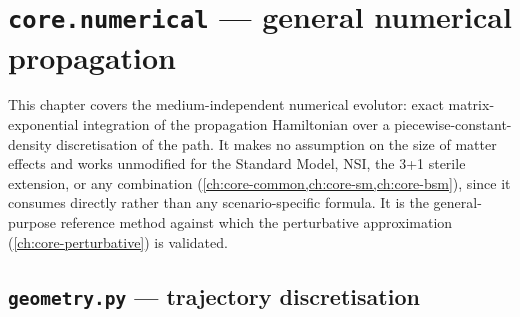 \chapter{\texttt{core.numerical} --- general numerical propagation}
\label{ch:core-numerical}

This chapter covers the medium-independent numerical evolutor: exact
matrix-exponential integration of the propagation Hamiltonian over a
piecewise-constant-density discretisation of the path. It makes no
assumption on the size of matter effects and works unmodified for the
Standard Model, NSI, the 3+1 sterile extension, or any combination
(\cref{ch:core-common,ch:core-sm,ch:core-bsm}), since it consumes
 directly rather than any scenario-specific
formula. It is the general-purpose reference method against which the
perturbative approximation (\cref{ch:core-perturbative}) is validated.

\section{\texttt{geometry.py} --- trajectory discretisation}


